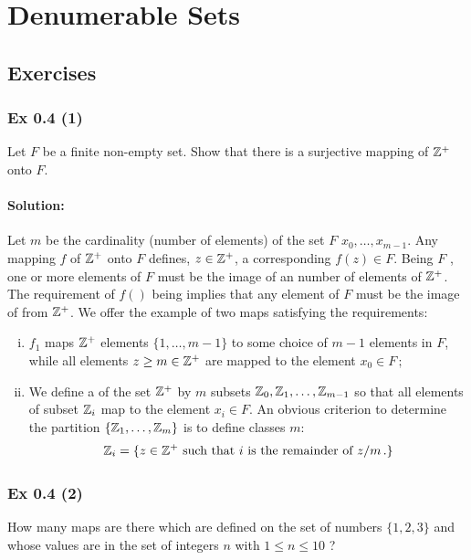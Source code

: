 {{%
\section{Denumerable Sets}\label{sec:0.4}	
\subsection*{Exercises}\label{sec:0.4_Exercises}
\subsubsection{Ex 0.4 (1)}\label{sec:Ex_0.4.1}
Let $F$ be a finite non-empty set. Show that there is a surjective mapping of $\mathbb{Z}^+$ onto $F$.
%
%
\paragraph{Solution:}{
  
Let $m$ be the cardinality (number of elements) of the set $F$   $x_0,\ldots, x_{m-1}$. 
Any mapping $f$ of $\mathbb{Z}^+$ onto $F$ defines,  $z \in \mathbb{Z}^+$, a corresponding $f(z) \in F$. Being $F$ , one or more elements of $F$ must be the image of an  number of elements of $\mathbb{Z}^+$. The requirement of $f()$ being  implies that any element of $F$ must be the image of  from $\mathbb{Z}^+$. We offer the example of two maps satisfying the requirements:
\begin{enumerate}[i)]
\item $f_1$ maps $\mathbb{Z}^+$ elements $\{1, \ldots, m-1\}$ to some choice of $m-1$ elements in $F$, while all elements $z \geq m \in \mathbb{Z}^+$ are mapped to the element $x_0 \in F\,;$
\item We define a  of the set $\mathbb{Z}^+$ by $m$  subsets $\mathbb{Z}_0, \mathbb{Z}_1, \ldots, \mathbb{Z}_{m-1}$ so that all elements of subset $\mathbb{Z}_i$ map to the element $x_i \in F$. An obvious criterion to determine the partition $\{\mathbb{Z}_1, \ldots, \mathbb{Z}_m\}$ is to define classes $m$:
$$ \mathbb{Z}_i = \{ z \in \mathbb{Z}^+ \text{ such that } i \text{ is the remainder of } z/m\,.\} $$     
\end{enumerate}

 

}

\subsubsection{Ex 0.4 (2)}\label{sec:Ex_0.4.2}
How many maps are there which are defined on the set of numbers $\{1, 2, 3  \}$ and whose values
are in the set of integers $n$ with $1 \leq n \leq 10$ ? 
%
%
}}
